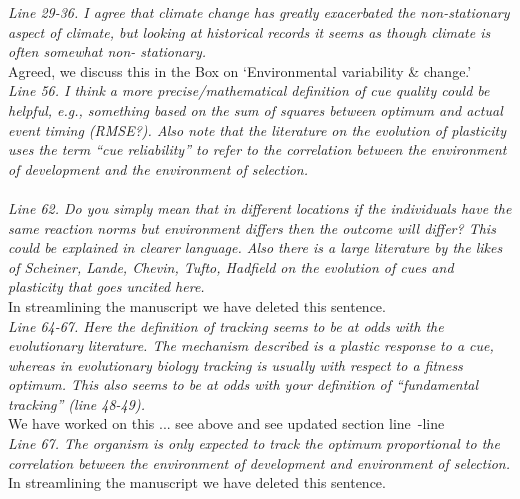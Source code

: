 \documentclass[11pt]{article}
\newcommand{\lr}[1]{line~\lineref{#1}}
\begin{document}
\emph{Line 29-36. I agree that climate change has greatly exacerbated the non-stationary aspect of
climate, but looking at historical records it seems as though climate is often somewhat non-
stationary.}\\

Agreed, we discuss this in the Box on `Environmental variability \& change.'\\

\emph{Line 56. I think a more precise/mathematical definition of cue quality could be helpful, e.g., something based on the sum of squares between optimum and actual event timing (RMSE?). Also note that the literature on the evolution of plasticity uses the term “cue reliability”
to refer to the correlation between the environment of development and the environment of
selection.}\\

\\

\emph{Line 62. Do you simply mean that in different locations if the individuals have the same
reaction norms but environment differs then the outcome will differ? This could be explained
in clearer language.  Also there is a large literature by the likes of Scheiner, Lande,
Chevin, Tufto, Hadfield on the evolution of cues and plasticity that goes uncited here.}\\

In streamlining the manuscript we have deleted this sentence.\\

\emph{Line 64-67. Here the definition of tracking seems to be at odds with the evolutionary
literature. The mechanism described is a plastic response to a cue, whereas in evolutionary
biology tracking is usually with respect to a fitness optimum. This also seems to be at odds
with your definition of “fundamental tracking” (line 48-49).}\\

We have worked on this ... see above and see updated section \lr{r1ass1}-\lr{moretrackE}\\

\emph{Line 67. The organism is only expected to track the optimum proportional to the correlation
between the environment of development and environment of selection.}\\

In streamlining the manuscript we have deleted this sentence.\\
\end{document}
